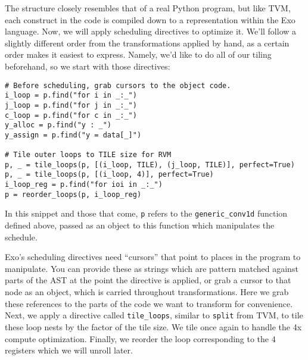 \documentclass[acmsmall, nonacm=true]{acmart}
\begin{document}
The structure closely resembles that of a real Python program, but like TVM, each construct in the code is compiled down to a representation within the Exo language. Now, we will apply scheduling directives to optimize it. We'll follow a slightly different order from the transformations applied by hand, as a certain order makes it easiest to express. Namely, we'd like to do all of our tiling beforehand, so we start with those directives:
\begin{verbatim}
# Before scheduling, grab cursors to the object code.
i_loop = p.find("for i in _:_")
j_loop = p.find("for j in _:_")
c_loop = p.find("for c in _:_")
y_alloc = p.find("y : _")
y_assign = p.find("y = data[_]")

# Tile outer loops to TILE size for RVM
p, _ = tile_loops(p, [(i_loop, TILE), (j_loop, TILE)], perfect=True)
p, _ = tile_loops(p, [(i_loop, 4)], perfect=True)
i_loop_reg = p.find("for ioi in _:_")
p = reorder_loops(p, i_loop_reg)
\end{verbatim}

In this snippet and those that come, \verb|p| refers to the \verb|generic_conv1d| function defined above, passed as an object to this function which manipulates the schedule. 

Exo's scheduling directives need ``cursors'' that point to places in the program to manipulate. You can provide these as strings which are pattern matched against parts of the AST at the point the directive is applied, or grab a cursor to that node as an object, which is carried throughout transformations. Here we grab these references to the parts of the code we want to transform for convenience. Next, we apply a directive called \verb|tile_loops|, similar to \verb|split| from TVM, to tile these loop nests by the factor of the tile size. We tile once again to handle the 4x compute optimization. Finally, we reorder the loop corresponding to the 4 registers which we will unroll later.
\end{document}
